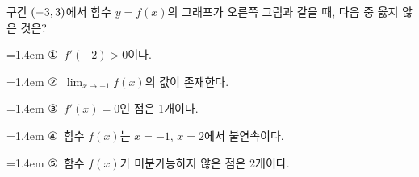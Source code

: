 \noindent\begin{minipage}[t]{0.58\linewidth}\vspace{0pt}\raggedright 구간 $(-3{,}\mkern3mu\mathopen{}3)$에서 함수 $y=f(x)$의 그래프가 오른쪽 그림과 같을 때, 다음 중 옳지 않은 것은?\end{minipage}\hfill\begin{minipage}[t]{0.4\linewidth}\vspace{0pt}\centering \resizebox{\ifdim\width>\linewidth\linewidth\else\width\fi}{!}{}\end{minipage}\par
\par\medskip\par\noindent\hangindent=1.4em {\small ①}\ $f'(-2)>0$이다.\par\noindent\hangindent=1.4em {\small ②}\ $\displaystyle\lim_{x\to-1} f(x)$의 값이 존재한다.\par\noindent\hangindent=1.4em {\small ③}\ $f'(x)=0$인 점은 1개이다.\par\noindent\hangindent=1.4em {\small ④}\ 함수 $f(x)$는 $x=-1$, $x=2$에서 불연속이다.\par\noindent\hangindent=1.4em {\small ⑤}\ 함수 $f(x)$가 미분가능하지 않은 점은 2개이다.\par\medskip
